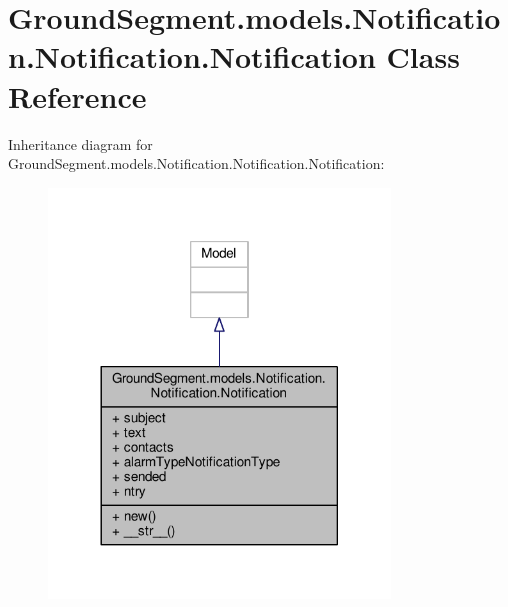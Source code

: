 \hypertarget{class_ground_segment_1_1models_1_1_notification_1_1_notification_1_1_notification}{}\section{Ground\+Segment.\+models.\+Notification.\+Notification.\+Notification Class Reference}
\label{class_ground_segment_1_1models_1_1_notification_1_1_notification_1_1_notification}


Inheritance diagram for Ground\+Segment.\+models.\+Notification.\+Notification.\+Notification\+:\nopagebreak
\begin{figure}[H]
\begin{center}
\leavevmode
\includegraphics[width=257pt]{class_ground_segment_1_1models_1_1_notification_1_1_notification_1_1_notification__inherit__graph}
\end{center}
\end{figure}



